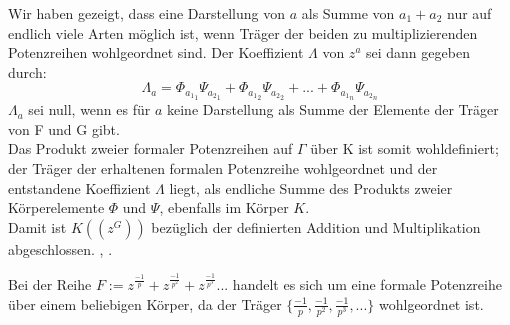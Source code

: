 Wir haben gezeigt, dass eine Darstellung von $a$ als Summe von $a_1+ a_2$ nur auf endlich viele Arten möglich ist, wenn Träger der beiden zu multiplizierenden Potenzreihen wohlgeordnet sind. Der Koeffizient $\Lambda$ von $z^a$ sei dann gegeben durch:\\
\[\Lambda_a = \Phi_{{a_1}_1}\Psi_{{a_2}_1} + \Phi_{{a_1}_2}\Psi_{{a_2}_2} + ... + \Phi_{{a_1}_n}\Psi_{{a_2}_n}\]
$\Lambda_a$ sei null, wenn es für $a$ keine Darstellung als Summe der Elemente der Träger von F und G gibt.\\
Das Produkt zweier formaler Potenzreihen auf $\Gamma$ über K ist somit wohldefiniert; der Träger der erhaltenen formalen Potenzreihe wohlgeordnet und der entstandene Koeffizient $\Lambda$ liegt, als endliche Summe des Produkts zweier Körperelemente $\Phi$ und $\Psi$, ebenfalls im Körper $K$. \\
Damit ist $K\left(\left(z^{G}\right)\right)$ bezüglich der definierten Addition und Multiplikation abgeschlossen. \cite[Seite 601ff]{hahn07}, \cite[S. 210- 213]{neumann49}.
%
\begin{bsp}
Bei der Reihe $F := z^{\frac{-1}{p}}+  z^{\frac{-1}{p^2}} + z^{\frac{-1}{p^3}} ...$ handelt es sich um eine formale Potenzreihe über einem beliebigen Körper, da der Träger $\lbrace \frac{-1}{p}, \frac{-1}{p^2}, \frac{-1}{p^3}, ... \rbrace$ wohlgeordnet ist.
\end{bsp}
%
